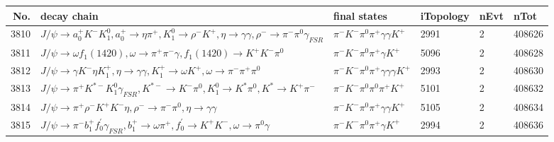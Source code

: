 \begin{table}[htbp] 
\begin{center}
\begin{small}
\begin{tabular}{rlllll}\hline\hline
 No. & decay chain & final states &  iTopology & nEvt & nTot \\\hline
3810&$J/\psi       \rightarrow a_{0}^{+}      K^{-}          K_1^{0}        , a_{0}^{+}       \rightarrow \eta          \pi^{+}        , K_1^{0}         \rightarrow \rho^{-}      K^{+}          , \eta           \rightarrow \gamma       \gamma       , \rho^{-}       \rightarrow \pi^{-}        \pi^{0}        \gamma_{FSR} $&$\pi^{-}        K^{-}          \pi^{0}        \pi^{+}        \gamma       \gamma       K^{+}          $& 2991&    2&408626\\
3811&$J/\psi       \rightarrow \omega         f_{1}(1420)    , \omega          \rightarrow \pi^{+}        \pi^{-}        \gamma       , f_{1}(1420)     \rightarrow K^{+}          K^{-}          \pi^{0}        $&$\pi^{-}        K^{-}          \pi^{0}        \pi^{+}        \gamma       K^{+}          $& 5096&    2&408628\\
3812&$J/\psi       \rightarrow \gamma       K^{-}          \eta          K_1^{+}        , \eta           \rightarrow \gamma       \gamma       , K_1^{+}         \rightarrow \omega         K^{+}          , \omega          \rightarrow \pi^{-}        \pi^{+}        \pi^{0}        $&$\pi^{-}        K^{-}          \pi^{0}        \pi^{+}        \gamma       \gamma       \gamma       K^{+}          $& 2993&    2&408630\\
3813&$J/\psi       \rightarrow \pi^{+}        K^{*-}         K_1^{0}        \gamma_{FSR} , K^{*-}          \rightarrow K^{-}          \pi^{0}        , K_1^{0}         \rightarrow K^{*}          \pi^{0}        , K^{*}           \rightarrow K^{+}          \pi^{-}        $&$\pi^{-}        K^{-}          \pi^{0}        \pi^{0}        \pi^{+}        K^{+}          $& 5101&    2&408632\\
3814&$J/\psi       \rightarrow \pi^{+}        \rho^{-}      K^{+}          K^{-}          \eta          , \rho^{-}       \rightarrow \pi^{-}        \pi^{0}        , \eta           \rightarrow \gamma       \gamma       $&$\pi^{-}        K^{-}          \pi^{0}        \pi^{+}        \gamma       \gamma       K^{+}          $& 5105&    2&408634\\
3815&$J/\psi       \rightarrow \pi^{-}        b_{1}^{+}      f^{'}_{0}     \gamma_{FSR} , b_{1}^{+}       \rightarrow \omega         \pi^{+}        , f^{'}_{0}      \rightarrow K^{+}          K^{-}          , \omega          \rightarrow \pi^{0}        \gamma       $&$\pi^{-}        K^{-}          \pi^{0}        \pi^{+}        \gamma       K^{+}          $& 2994&    2&408636\\

\end{tabular}
\end{small}
\end{center}
\end{table}
